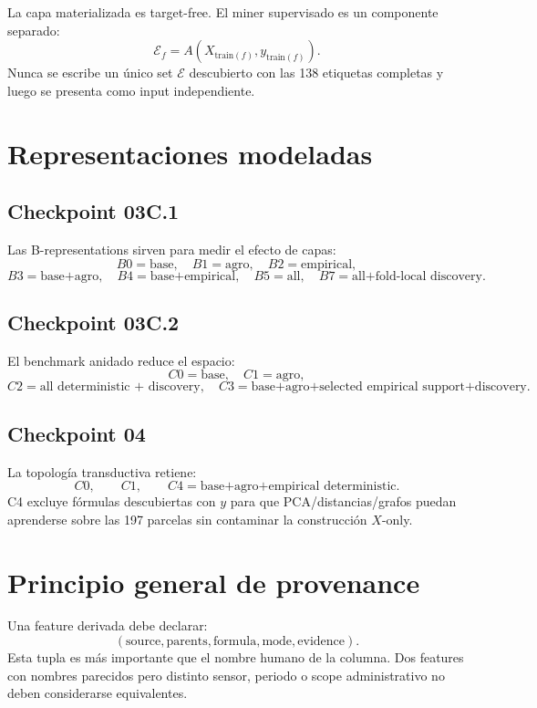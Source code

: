La capa materializada es target-free. El miner supervisado es un componente separado:
\[
\mathcal E_f=A(X_{\mathrm{train}(f)},y_{\mathrm{train}(f)}).
\]
Nunca se escribe un único set $\mathcal E$ descubierto con las 138 etiquetas completas y luego
se presenta como input independiente.

\section{Representaciones modeladas}

\subsection{Checkpoint 03C.1}

Las B-representations sirven para medir el efecto de capas:
\[
B0=\text{base},\quad
B1=\text{agro},\quad
B2=\text{empirical},
\]
\[
B3=\text{base+agro},\quad
B4=\text{base+empirical},\quad
B5=\text{all},\quad
B7=\text{all+fold-local discovery}.
\]

\subsection{Checkpoint 03C.2}

El benchmark anidado reduce el espacio:
\[
C0=\text{base},\quad
C1=\text{agro},
\]
\[
C2=\text{all deterministic + discovery},\quad
C3=\text{base+agro+selected empirical support+discovery}.
\]

\subsection{Checkpoint 04}

La topología transductiva retiene:
\[
C0,\qquad C1,\qquad C4=\text{base+agro+empirical deterministic}.
\]
C4 excluye fórmulas descubiertas con $y$ para que PCA/distancias/grafos puedan aprenderse sobre
las 197 parcelas sin contaminar la construcción $X$-only.

\section{Principio general de provenance}

Una feature derivada debe declarar:
\[
(\text{source},\text{parents},\text{formula},\text{mode},\text{evidence}).
\]
Esta tupla es más importante que el nombre humano de la columna. Dos features con nombres
parecidos pero distinto sensor, periodo o scope administrativo no deben considerarse
equivalentes.
